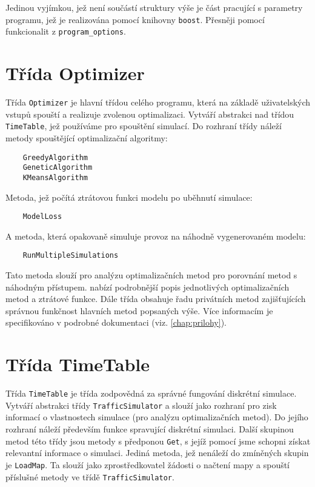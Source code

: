 Jedinou vyjímkou, jež není součástí struktury výše je část pracující s 
parametry programu, jež je realizována pomocí knihovny \texttt{boost}. Přesněji pomocí
funkcionalit z \texttt{program\_options}.


\section{Třída Optimizer}

Třída \texttt{Optimizer} je hlavní třídou celého programu, která na základě 
uživatelských vstupů spouští a realizuje zvolenou optimalizaci. Vytváří 
abstrakci nad třídou \texttt{TimeTable}, jež používáme pro spouštění simulací. 
Do rozhraní třídy náleží metody spouštějící optimalizační algoritmy:

\begin{verbatim}
    GreedyAlgorithm
    GeneticAlgorithm
    KMeansAlgorithm
\end{verbatim}

Metoda, jež počítá ztrátovou funkci modelu po uběhnutí simulace:
\begin{verbatim}
    ModelLoss
\end{verbatim}

A metoda, která opakovaně simuluje provoz na náhodně vygenerovaném modelu:
\begin{verbatim}
    RunMultipleSimulations
\end{verbatim}

Tato metoda slouží pro analýzu optimalizačních metod pro porovnání metod s 
náhodným přístupem.  nabízí podrobnější popis jednotlivých 
optimalizačních metod a ztrátové funkce. Dále třída obsahuje řadu privátních 
metod zajišťujících správnou funkčnost hlavních metod popsaných výše. Více informacím
je specifikováno v podrobné dokumentaci (viz. \cref{chap:prilohy}).

\section{Třída TimeTable}

Třída \texttt{TimeTable} je třída zodpovědná za správné fungování diskrétní
simulace. Vytváří abstrakci třídy \texttt{TrafficSimulator} a slouží jako rozhraní pro
zisk informací o vlastnostech simulace (pro analýzu optimalizačních metod). 
Do jejího rozhraní náleží především funkce spravující diskrétní simulaci.
Další skupinou metod této třídy jsou metody s předponou \texttt{Get}, 
s jejíž pomocí jsme schopni získat relevantní informace o simulaci.
Jediná metoda, jež nenáleží do zmíněných skupin je \texttt{LoadMap}. Ta slouží
jako zprostředkovatel žádosti o načtení mapy a spouští příslušné
metody ve třídě \texttt{TrafficSimulator}.

